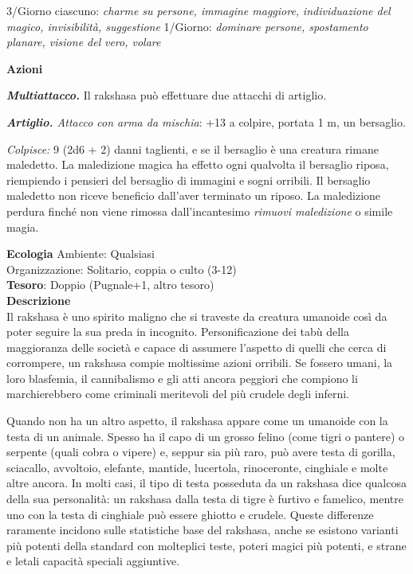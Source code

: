 \begin{multicols}{2}
	3/Giorno ciascuno: \textit{charme su persone, immagine maggiore,} \textit{individuazione del magico, invisibilità, suggestione} 1/Giorno: \textit{dominare persone, spostamento planare, visione del} \textit{vero, volare}

	\textbf{Azioni}

	\textit{\textbf{Multiattacco.}} Il rakshasa può effettuare due attacchi di artiglio.

	\textit{\textbf{Artiglio.} Attacco con arma da mischia}: +13 a colpire, portata 1 m, un bersaglio.

	\textit{Colpisce:} 9 (2d6 + 2) danni taglienti, e se il bersaglio è una creatura rimane maledetto. La maledizione magica ha effetto ogni qualvolta il bersaglio riposa, riempiendo i pensieri del bersaglio di immagini e sogni orribili. Il bersaglio maledetto non riceve beneficio dall'aver terminato un riposo. La maledizione perdura finché non viene rimossa dall'incantesimo \textit{rimuovi maledizione} o simile magia.

	\textbf{Ecologia}
	Ambiente: Qualsiasi\\
	Organizzazione: Solitario, coppia o culto (3-12)\\
	\textbf{Tesoro}: Doppio (Pugnale+1, altro tesoro)\\
	\textbf{Descrizione}\\
	Il rakshasa è uno spirito maligno che si traveste da creatura umanoide così da poter seguire la sua preda in incognito. Personificazione dei tabù della maggioranza delle società e capace di assumere l'aspetto di quelli che cerca di corrompere, un rakshasa compie moltissime azioni orribili. Se fossero umani, la loro blasfemia, il cannibalismo e gli atti ancora peggiori che compiono li marchierebbero come criminali meritevoli del più crudele degli inferni.

	Quando non ha un altro aspetto, il rakshasa appare come un umanoide con la testa di un animale. Spesso ha il capo di un grosso felino (come tigri o pantere) o serpente (quali cobra o vipere) e, seppur sia più raro, può avere testa di gorilla, sciacallo, avvoltoio, elefante, mantide, lucertola, rinoceronte, cinghiale e molte altre ancora. In molti casi, il tipo di testa posseduta da un rakshasa dice qualcosa della sua personalità: un rakshasa dalla testa di tigre è furtivo e famelico, mentre uno con la testa di cinghiale può essere ghiotto e crudele. Queste differenze raramente incidono sulle statistiche base del rakshasa, anche se esistono varianti più potenti della standard con molteplici teste, poteri magici più potenti, e strane e letali capacità speciali aggiuntive.


\end{multicols}
